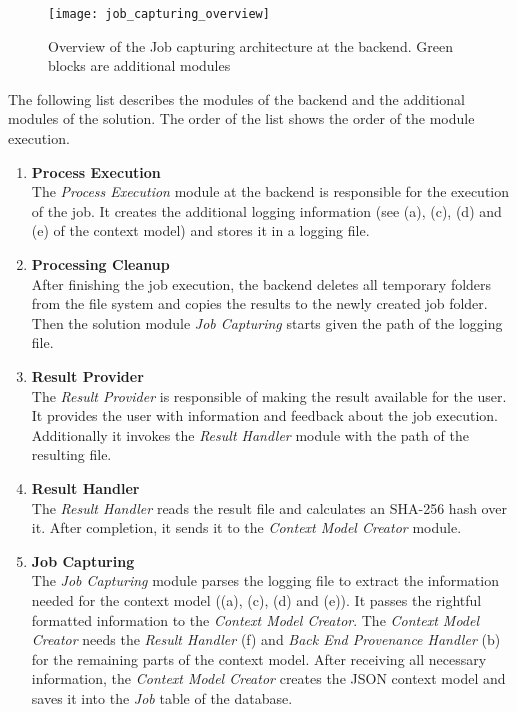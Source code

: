 \documentclass[draft,final]{vutinfth} %
\begin{document}
\begin{figure}[h]
	\centering
	\texttt{[image: job\_capturing\_overview]}
	\caption{Overview of the Job capturing architecture at the backend. Green blocks are additional modules}
	\label{fig:impljobcapture} %
\end{figure}

The following list describes the modules of the backend and the additional modules of the solution. The order of the list shows the order of the module execution. 

\begin{enumerate}
	\item \textbf{Process Execution} \\
	The \textit{Process Execution} module at the backend is responsible for the execution of the job. It creates the additional logging information (see (a), (c), (d) and (e) of the context model) and stores it in a logging file. 
	\item \textbf{Processing Cleanup} \\
	After finishing the job execution, the backend deletes all temporary folders from the file system and copies the results to the newly created job folder. Then the solution module \textit{Job Capturing} starts given the path of the logging file.  
	\item \textbf{Result Provider} \\
	The \textit{Result Provider} is responsible of making the result available for the user. It provides the user with information and feedback about the job execution. Additionally it invokes the \textit{Result Handler} module with the path of the resulting file.
	\item \textbf{Result Handler} \\
	The \textit{Result Handler} reads the result file and calculates an SHA-256 hash over it. After completion, it sends it to the \textit{Context Model Creator} module.  
	\item \textbf{Job Capturing} \\
	The \textit{Job Capturing} module parses the logging file to extract the information needed for the context model ((a), (c), (d) and (e)). It passes the rightful formatted information to the \textit{Context Model Creator}. The \textit{Context Model Creator} needs the \textit{Result Handler} (f) and \textit{Back End Provenance Handler} (b) for the remaining parts of the context model. After receiving all necessary information, the \textit{Context Model Creator} creates the JSON context model and saves it into the \textit{Job} table of the database.    
\end{enumerate}
\end{document}
